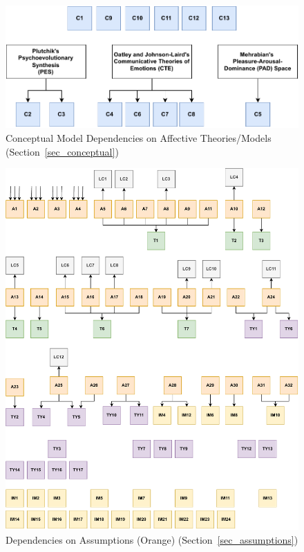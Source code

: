\vspace*{\fill}
\begin{figure}[tbh]
    \centering
    \includegraphics[width=\linewidth]{figures/theories2concept.pdf}
    \caption[Conceptual Model Dependencies on Affective
    Theories/Models]{Conceptual Model Dependencies on Affective Theories/Models
    (Section~\ref{sec_conceptual})}
    \label{fig:theories2conceptual}
\end{figure}
\vspace*{\fill}

\begin{figure}[tbh]
    \centering
    \includegraphics[height=0.88\textheight]{figures/assumptions2All.pdf}
    \caption[Dependencies on Assumptions]{Dependencies on Assumptions (Orange)
    (Section~\ref{sec_assumptions})}
    \label{fig:A2All}
\end{figure}

